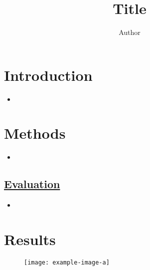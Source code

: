 \documentclass[misc, color=UCLburgundy, margin=2cm]{uclposter}
\begin{document}
\title{Title}

\author[1 *]{Author}


\maketitle

\begin{multicols}{4}
\normalsize

\section*{Introduction}
    \begin{highlightbox}[UCLlightgreen]
        \begin{itemize}
            \item \blindtext
        \end{itemize}
    \end{highlightbox}

\section*{Methods}
    \begin{itemize}
        \subsection*{\underline{\textbf{Subsection}}}
            \item \blindtext
    \end{itemize}
    
    \subsection*{\underline{\textbf{Evaluation}}}
        \begin{highlightbox}[UCLlightgreen]
            \begin{itemize}
                \item \blindtext
            \end{itemize}
        \end{highlightbox}

\section*{Results}
    \begin{figure}[H]
        \centering
        \texttt{[image: example-image-a]}
        \begin{highlightbox}[UCLlightblue]
            \captionsetup{singlelinecheck=false, justification=centering}
            \caption{\blindtext}
        \end{highlightbox}
        \label{fig:com_graph}
    \end{figure}


\end{multicols}
\end{document}
